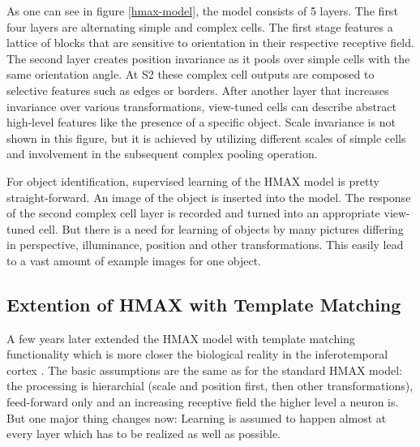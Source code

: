 			As one can see in figure \ref{hmax-model}, the model consists of 5 layers. The first four layers are alternating simple and complex cells. The first stage features a lattice of blocks that are sensitive to orientation in their respective receptive field. The second layer creates position invariance as it pools over simple cells with the same orientation angle. At S2 these complex cell outputs are composed to selective features such as edges or borders. After another layer that increases invariance over various transformations, view-tuned cells can describe abstract high-level features like the presence of a specific object. Scale invariance is not shown in this figure, but it is achieved by utilizing different scales of simple cells and involvement in the subsequent complex pooling operation.
			
			For object identification, supervised learning of the HMAX model is pretty straight-forward. An image of the object is inserted into the model. The response of the second complex cell layer is recorded and turned into an appropriate view-tuned cell. But there is a need for learning of objects by many pictures differing in perspective, illuminance, position and other transformations. This easily lead to a vast amount of example images for one object.
		
		\subsection{Extention of HMAX with Template Matching}
		
			A few years later \citeauthor{serre2007robust} extended the HMAX model with template matching functionality which is more closer the biological reality in the inferotemporal cortex \citep{poggio2004generalization}. The basic assumptions are the same as for the standard HMAX model: the processing is hierarchial (scale and position first, then other transformations), feed-forward only and an increasing receptive field the higher level a neuron is. But one major thing changes now: Learning is assumed to happen almost at every layer which has to be realized as well as possible.
	
